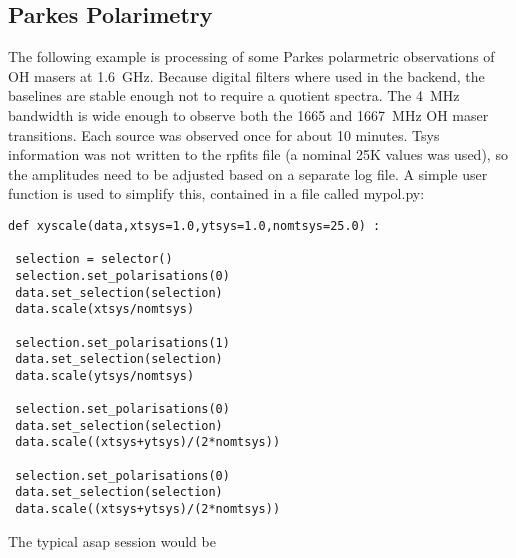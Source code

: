 \documentclass[11pt]{article}
\begin{document}
\subsection{Parkes Polarimetry}

The following example is processing
of some Parkes polarmetric observations of OH masers at
1.6~GHz. Because digital filters where used in the backend, the
baselines are stable enough not to require a quotient spectra. The
4~MHz bandwidth is wide enough to observe both the 1665 and 1667~MHz
OH maser transitions. Each source was observed once for about 10
minutes. Tsys information was not written to the rpfits file (a
nominal 25K values was used), so the amplitudes need to be adjusted
based on a separate log file. A simple user function is used to
simplify this, contained in a file called mypol.py:

\begin{verbatim}
def xyscale(data,xtsys=1.0,ytsys=1.0,nomtsys=25.0) :

 selection = selector()
 selection.set_polarisations(0)
 data.set_selection(selection)
 data.scale(xtsys/nomtsys)

 selection.set_polarisations(1)
 data.set_selection(selection)
 data.scale(ytsys/nomtsys)

 selection.set_polarisations(0)
 data.set_selection(selection)
 data.scale((xtsys+ytsys)/(2*nomtsys))

 selection.set_polarisations(0)
 data.set_selection(selection)
 data.scale((xtsys+ytsys)/(2*nomtsys))
\end{verbatim}

The typical asap session would be
\end{document}
